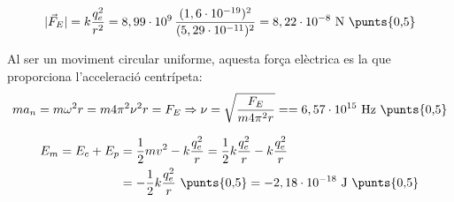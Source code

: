 \begin{solapartat}
\[ |\vec{F}_E| = k\frac{q_e^2}{r^2} = 8,99\cdot 10^{9}\,\frac{(1,6\cdot 10^{-19})^2}{(5,29\cdot 10^{-11})^2} = 8,22\cdot 10^{-8}\ \mathrm{N}\ \text{\punts{0,5}} \]

Al ser un moviment circular uniforme, aquesta força elèctrica es la que proporciona l'acceleració centrípeta:
\[ ma_n = m\omega^2 r = m4\pi^2\nu^2 r = F_E \Rightarrow \nu = \sqrt{\frac{F_E}{m4\pi^2 r}} = = 6,57\cdot 10^{15}\ \mathrm{Hz}\ \text{\punts{0,5}} \]
\end{solapartat}

\begin{solapartat}
\begin{align*}
E_m = E_c + E_p &= \frac{1}{2}mv^2 - k\frac{q_e^2}{r} = \frac{1}{2}k\frac{q_e^2}{r} - k\frac{q_e^2}{r}\\
&= -\frac{1}{2}k\frac{q_e^2}{r}\ \text{\punts{0,5}} = -2,18\cdot 10^{-18}\ \mathrm{J}\ \text{\punts{0,5}}
\end{align*}
\end{solapartat}
